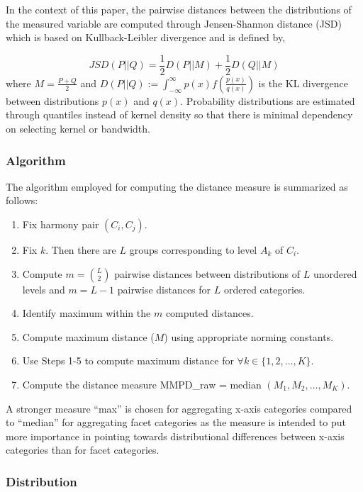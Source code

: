 \documentclass[
]{article}
\begin{document}
In the context of this paper, the pairwise distances between the distributions of the measured variable are computed through Jensen-Shannon distance (JSD) which is based on Kullback-Leibler divergence and is defined by,

\[JSD(P||Q) = \frac{1}{2}D(P||M) + \frac{1}{2}D(Q||M)\]
where \(M = \frac{P+Q}{2}\) and
\(D(P||Q) := \int^\infty_{-\infty} p(x)f(\frac{p(x)}{q(x)})\) is the KL divergence between distributions \(p(x)\) and \(q(x)\). Probability distributions are estimated through quantiles instead of kernel density so that there is minimal dependency on selecting kernel or bandwidth.

\hypertarget{algorithm}{%
\subsubsection{Algorithm}\label{algorithm}}

The algorithm employed for computing the distance measure is summarized as follows:

\begin{enumerate}
\def\labelenumi{\arabic{enumi}.}
\item
  Fix harmony pair \((C_i, C_j)\).
\item
  Fix \(k\). Then there are \(L\) groups corresponding to level \(A_k\) of \(C_i\).
\item
  Compute \(m = \binom{L}{2}\) pairwise distances between distributions of \(L\) unordered levels and \(m = L-1\) pairwise distances for \(L\) ordered categories.
\item
  Identify maximum within the \(m\) computed distances.
\item
  Compute maximum distance (\(M\)) using appropriate norming constants.
\item
  Use Steps 1-5 to compute maximum distance for \(\forall k \in \{1, 2, \ldots, K\}\).
\item
  Compute the distance measure MMPD\_raw = median \((M_1, M_2, \dots, M_K)\).
\end{enumerate}

A stronger measure ``max'' is chosen for aggregating x-axis categories compared to ``median'' for aggregating facet categories as the measure is intended to put more importance in pointing towards distributional differences between x-axis categories than for facet categories.

\hypertarget{distribution}{%
\subsubsection{Distribution}\label{distribution}}
\end{document}
